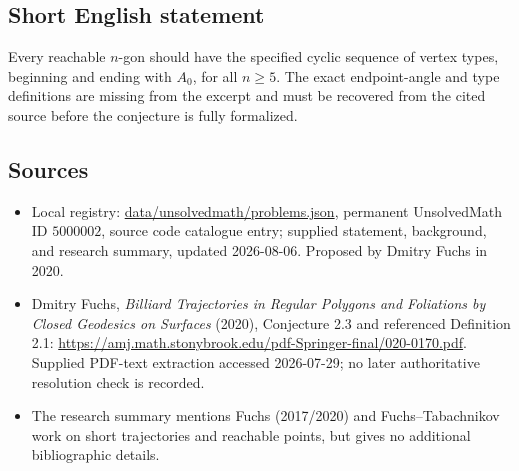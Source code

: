 \documentclass[11pt]{article}
\begin{document}
\subsection{Short English statement}
Every reachable \(n\)-gon should have the specified cyclic sequence of vertex types, beginning and ending with \(A_0\), for all \(n\ge5\). The exact endpoint-angle and type definitions are missing from the excerpt and must be recovered from the cited source before the conjecture is fully formalized.
\subsection{Sources}
\begin{itemize}
\item Local registry: \url{data/unsolvedmath/problems.json}, permanent UnsolvedMath ID \(5000002\), source code catalogue entry; supplied statement, background, and research summary, updated 2026-08-06. Proposed by Dmitry Fuchs in 2020.
\item Dmitry Fuchs, \emph{Billiard Trajectories in Regular Polygons and Foliations by Closed Geodesics on Surfaces} (2020), Conjecture 2.3 and referenced Definition 2.1: \url{https://amj.math.stonybrook.edu/pdf-Springer-final/020-0170.pdf}. Supplied PDF-text extraction accessed 2026-07-29; no later authoritative resolution check is recorded.
\item The research summary mentions Fuchs (2017/2020) and Fuchs--Tabachnikov work on short trajectories and reachable points, but gives no additional bibliographic details.
\end{itemize}
\end{document}
